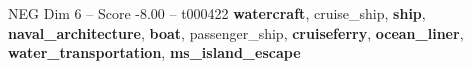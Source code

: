 \begin{textsample}{NEG Dim 6 – Score -8.00 – t000422}  \label{ex:f6_neg_019}
\textbf{watercraft}, cruise\_ship, \textbf{ship}, \textbf{naval\_architecture}, \textbf{boat}, passenger\_ship, \textbf{cruiseferry}, \textbf{ocean\_liner}, \textbf{water\_transportation}, \textbf{ms\_island\_escape}

\end{textsample}
